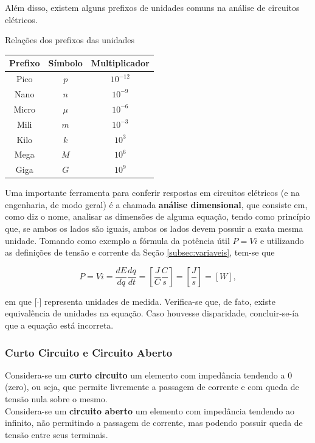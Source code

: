 \documentclass{article}
\numberwithin{equation}{section}
\let\dfr\dfrac
\begin{document}
Além disso, existem alguns prefixos de unidades comuns na análise de circuitos elétricos.

\begin{center}
    Relações dos prefixos das unidades \\
    \begin{tabular}{|c|c|c|} \hline
        Prefixo & Símbolo & Multiplicador \\ \hline
        Pico & $p$ & $10^{-12}$ \\
        Nano & $n$ & $10^{-9}$ \\
        Micro & $\mu$ & $10^{-6}$ \\
        Mili & $m$ & $10^{-3}$ \\
        Kilo & $k$ & $10^{3}$ \\
        Mega & $M$ & $10^{6}$ \\
        Giga & $G$ & $10^{9}$ \\ \hline
    \end{tabular}
\end{center}

Uma importante ferramenta para conferir respostas em circuitos elétricos (e na engenharia, de modo geral) é a chamada \textbf{análise dimensional}, que consiste em, como diz o nome, analisar as dimensões de alguma equação, tendo como princípio que, se ambos os lados são iguais, ambos os lados devem possuir a exata mesma unidade. Tomando como exemplo a fórmula da potência útil $P = Vi$ e utilizando as definições de tensão e corrente da Seção \ref{subsec:variaveis}, tem-se que

\begin{equation}
    P = Vi = \dfr{dE}{dq} \dfr{dq}{dt} = \left[\dfr{J}{C}\dfr{C}{s}\right] = \left[\dfr{J}{s}\right] = [W],
\end{equation}

\noindent em que [$\cdot$] representa unidades de medida. Verifica-se que, de fato, existe equivalência de unidades na equação. Caso houvesse disparidade, concluir-se-ía que a equação está incorreta.

\subsubsection{Curto Circuito e Circuito Aberto}
Considera-se um \textbf{curto circuito} um elemento com impedância tendendo a 0 (zero), ou seja, que permite livremente a passagem de corrente e com queda de tensão nula sobre o mesmo. \\
\indent Considera-se um \textbf{circuito aberto} um elemento com impedância tendendo ao infinito, não permitindo a passagem de corrente, mas podendo possuir queda de tensão entre seus terminais.
\end{document}
